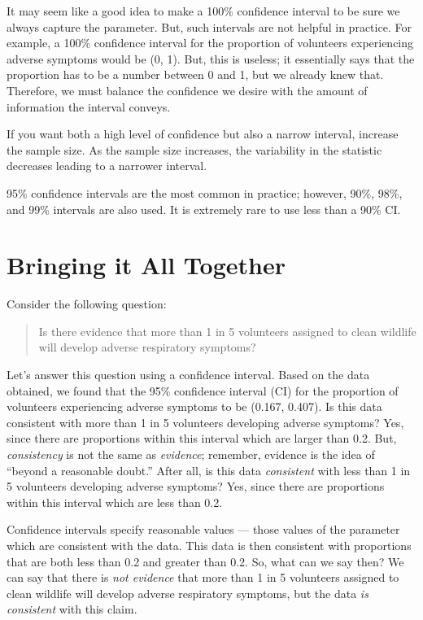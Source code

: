 \documentclass[]{book}
\theoremstyle{plain}
\theoremstyle{mydefn}
\theoremstyle{myexmpl}
\theoremstyle{remark}
\let\BeginKnitrBlock\begin \let\EndKnitrBlock\end
\let\BeginKnitrBlock\begin \let\EndKnitrBlock\end
\begin{document}
It may seem like a good idea to make a 100\% confidence interval to be
sure we always capture the parameter. But, such intervals are not
helpful in practice. For example, a 100\% confidence interval for the
proportion of volunteers experiencing adverse symptoms would be (0, 1).
But, this is useless; it essentially says that the proportion has to be
a number between 0 and 1, but we already knew that. Therefore, we must
balance the confidence we desire with the amount of information the
interval conveys.

\BeginKnitrBlock{rmdtip}
If you want both a high level of confidence but also a narrow interval,
increase the sample size. As the sample size increases, the variability
in the statistic decreases leading to a narrower interval.
\EndKnitrBlock{rmdtip}

\BeginKnitrBlock{rmdtip}
95\% confidence intervals are the most common in practice; however,
90\%, 98\%, and 99\% intervals are also used. It is extremely rare to
use less than a 90\% CI.
\EndKnitrBlock{rmdtip}

\section{Bringing it All Together}\label{bringing-it-all-together}

Consider the following question:

\begin{quote}
Is there evidence that more than 1 in 5 volunteers assigned to clean
wildlife will develop adverse respiratory symptoms?
\end{quote}

Let's answer this question using a confidence interval. Based on the
data obtained, we found that the 95\% confidence interval (CI) for the
proportion of volunteers experiencing adverse symptoms to be (0.167,
0.407). Is this data consistent with more than 1 in 5 volunteers
developing adverse symptoms? Yes, since there are proportions within
this interval which are larger than 0.2. But, \emph{consistency} is not
the same as \emph{evidence}; remember, evidence is the idea of ``beyond
a reasonable doubt.'' After all, is this data \emph{consistent} with
less than 1 in 5 volunteers developing adverse symptoms? Yes, since
there are proportions within this interval which are less than 0.2.

Confidence intervals specify reasonable values --- those values of the
parameter which are consistent with the data. This data is then
consistent with proportions that are both less than 0.2 and greater than
0.2. So, what can we say then? We can say that there is \emph{not
evidence} that more than 1 in 5 volunteers assigned to clean wildlife
will develop adverse respiratory symptoms, but the data \emph{is
consistent} with this claim.
\end{document}
